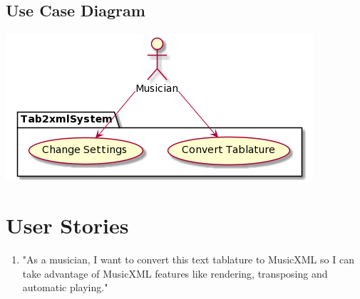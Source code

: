 \documentclass[11pt]{article}
\begin{document}
\subsection{Use Case Diagram}
\label{sec:org6b9ce36}
\begin{center}
\includegraphics[width=.9\linewidth]{./use-case-diagram.png}
\end{center}
\section{User Stories}
\label{sec:org4e590c0}
\begin{enumerate}
\item "As a musician, I want to convert this text tablature to MusicXML so I can take advantage of MusicXML features like rendering, transposing and automatic playing."
\end{enumerate}
\end{document}
